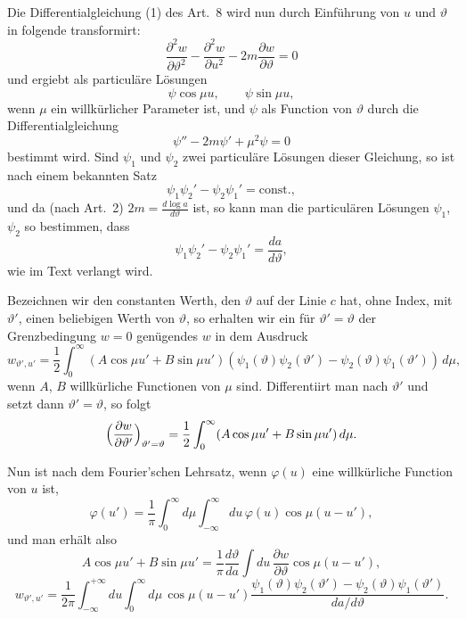 \documentclass[12pt,a4paper]{article}
\begin{document}
Die Differentialgleichung (1) des Art.~8 wird nun durch Einf\"uhrung von $u$ und $\vartheta$ in folgende transformirt:
\begin{equation*}
\frac{\partial^{2}w}{\partial\vartheta^{2}} - \frac{\partial^{2}w}{\partial u^{2}} - 2m\frac{\partial w}{\partial\vartheta} = 0\tag{1}
\end{equation*}
und ergiebt als particul\"are L\"osungen
\[
\psi\cos\mu u,\qquad \psi\sin\mu u,
\]
wenn $\mu$ ein willk\"urlicher Parameter ist, und $\psi$ als Function von $\vartheta$ durch die Differentialgleichung
\begin{equation*}
\psi'' - 2m\psi' + \mu^{2}\psi = 0\tag{2}
\end{equation*}
bestimmt wird. Sind $\psi_{1}$ und $\psi_{2}$ zwei particul\"are L\"osungen dieser Gleichung, so ist nach einem bekannten Satz
\[
\psi_{1}\psi_{2}' - \psi_{2}\psi_{1}' = \text{const.},
\]
und da (nach Art.~2) $2m = \frac{d\log a}{d\vartheta}$ ist, so kann man die particul\"aren L\"osungen $\psi_{1}$, $\psi_{2}$ so bestimmen, dass
\[
\psi_{1}\psi_{2}' - \psi_{2}\psi_{1}' = \frac{da}{d\vartheta},
\]
wie im Text verlangt wird.

Bezeichnen wir den constanten Werth, den $\vartheta$ auf der Linie $c$ hat, ohne Index, mit $\vartheta'$, einen beliebigen Werth von $\vartheta$, so erhalten wir ein f\"ur $\vartheta' = \vartheta$ der Grenzbedingung $w = 0$ gen\"ugendes $w$ in dem Ausdruck
\begin{equation*}
w_{\vartheta',u'} = \frac{1}{2}\int_{0}^{\infty}(A\cos\mu u' + B\sin\mu u')(\psi_{1}(\vartheta)\psi_{2}(\vartheta') - \psi_{2}(\vartheta)\psi_{1}(\vartheta'))\,d\mu,\tag{4}
\end{equation*}
wenn $A$, $B$ willk\"urliche Functionen von $\mu$ sind. Differentiirt man nach $\vartheta'$ und setzt dann $\vartheta' = \vartheta$, so folgt
\[
\Bigl(\frac{\partial w}{\partial\vartheta'}\Bigr)_{\vartheta'=\vartheta} = \frac{1}{2}\int_{0}^{\infty}(A\cos\mu u' + B\sin\mu u')\,d\mu.
\]

Nun ist nach dem Fourier'schen Lehrsatz, wenn $\varphi(u)$ eine willk\"urliche Function von $u$ ist,
\[
\varphi(u') = \frac{1}{\pi}\int_{0}^{\infty}d\mu\int_{-\infty}^{\infty}du\,\varphi(u)\cos\mu(u - u'),
\]
und man erh\"alt also
\[
A\cos\mu u' + B\sin\mu u' = \frac{1}{\pi}\frac{d\vartheta}{da}\int du\,\frac{\partial w}{\partial\vartheta}\cos\mu(u - u'),
\]
\[
w_{\vartheta',u'} = \frac{1}{2\pi}\int_{-\infty}^{+\infty}du\int_{0}^{\infty}d\mu\,\cos\mu(u - u')\frac{\psi_{1}(\vartheta)\psi_{2}(\vartheta') - \psi_{2}(\vartheta)\psi_{1}(\vartheta')}{da/d\vartheta}.
\]
\end{document}
